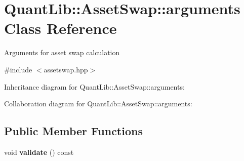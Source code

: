 \section{Quant\+Lib\+:\+:Asset\+Swap\+:\+:arguments Class Reference}
\label{class_quant_lib_1_1_asset_swap_1_1arguments}


Arguments for asset swap calculation  




{\ttfamily \#include $<$assetswap.\+hpp$>$}



Inheritance diagram for Quant\+Lib\+:\+:Asset\+Swap\+:\+:arguments\+:


Collaboration diagram for Quant\+Lib\+:\+:Asset\+Swap\+:\+:arguments\+:
\subsection*{Public Member Functions}
\begin{DoxyCompactItemize}
\item 
void {\bfseries validate} () const \label{class_quant_lib_1_1_asset_swap_1_1arguments_aa027cf062cef5da12e18b5375e437c1a}

\end{DoxyCompactItemize}
